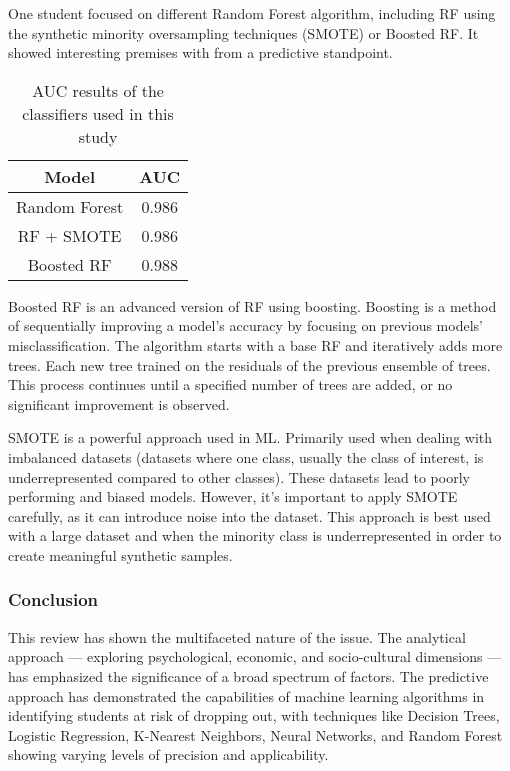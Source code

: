 \documentclass[conference]{IEEEtran}
\begin{document}
One student focused on different Random Forest algorithm, including RF using the synthetic minority oversampling techniques (SMOTE) or Boosted RF. It showed interesting premises with from a predictive standpoint. \cite{lee_machine_2019}
\begin{table}[H]
    \centering
    \caption{AUC results of the classifiers used in this study\cite{lee_machine_2019}}
    \begin{tabular}{|c|c|}
        \hline
        \textbf{Model} & \textbf{AUC}\\
        \hline
        Random Forest & 0.986 \\
        \hline
        RF + SMOTE & 0.986\\
        \hline
        Boosted RF & 0.988 \\
        \hline
    \end{tabular}
    \label{tab:auc_values_lee}
\end{table}

Boosted RF is an advanced version of RF using boosting. Boosting is a method of sequentially improving a model's accuracy by focusing on previous models' misclassification. The algorithm starts with a base RF and iteratively adds more trees. Each new tree trained on the residuals of the previous ensemble of trees. This process continues until a specified number of trees are added, or no significant improvement is observed.

SMOTE is a powerful approach used in ML. Primarily used when dealing with imbalanced datasets (datasets where one class, usually the class of interest, is underrepresented compared to other classes). These datasets lead to poorly performing and biased models.
However, it's important to apply SMOTE carefully, as it can introduce noise into the dataset. This approach is best used with a large dataset and when the minority class is underrepresented in order to create meaningful synthetic samples.

\vspace{8pt}
\subsubsection{Conclusion}
This review has shown the multifaceted nature of the issue. The analytical approach — exploring psychological, economic, and socio-cultural dimensions — has emphasized the significance of a broad spectrum of factors. The predictive approach has demonstrated the capabilities of machine learning algorithms in identifying students at risk of dropping out, with techniques like Decision Trees, Logistic Regression, K-Nearest Neighbors, Neural Networks, and Random Forest showing varying levels of precision and applicability.
\end{document}
